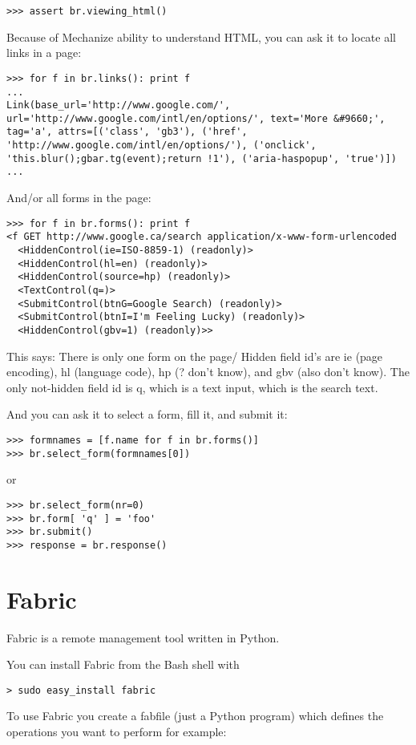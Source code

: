 \documentclass[justified,sixbynine]{tufte-book}
\theoremstyle{plain}%
\theoremstyle{definition}
\theoremstyle{remark}
\begin{document}
\begin{fullwidth}
\begin{lstlisting}
>>> assert br.viewing_html()
\end{lstlisting}
Because of Mechanize ability to understand HTML, you can ask it to locate all links in a page:
\begin{lstlisting}
>>> for f in br.links(): print f
...
Link(base_url='http://www.google.com/', url='http://www.google.com/intl/en/options/', text='More &#9660;', tag='a', attrs=[('class', 'gb3'), ('href', 'http://www.google.com/intl/en/options/'), ('onclick', 'this.blur();gbar.tg(event);return !1'), ('aria-haspopup', 'true')])
...
\end{lstlisting}
And/or all forms in the page:
\begin{lstlisting}
>>> for f in br.forms(): print f
<f GET http://www.google.ca/search application/x-www-form-urlencoded
  <HiddenControl(ie=ISO-8859-1) (readonly)>
  <HiddenControl(hl=en) (readonly)>
  <HiddenControl(source=hp) (readonly)>
  <TextControl(q=)>
  <SubmitControl(btnG=Google Search) (readonly)>
  <SubmitControl(btnI=I'm Feeling Lucky) (readonly)>
  <HiddenControl(gbv=1) (readonly)>>
\end{lstlisting}
This says: There is only one form on the page/ Hidden field id's are ie (page encoding), hl (language code), hp (? don't know), and gbv (also don't know). The only not-hidden field id is q, which is a text input, which is the search text.

And you can ask it to select a form, fill it, and submit it:
\begin{lstlisting}
>>> formnames = [f.name for f in br.forms()]
>>> br.select_form(formnames[0])
\end{lstlisting}
or
\begin{lstlisting}
>>> br.select_form(nr=0)
>>> br.form[ 'q' ] = 'foo'
>>> br.submit()
>>> response = br.response()
\end{lstlisting}

\goodbreak\chapter{Fabric}

Fabric is a remote management tool written in Python.

You can install Fabric from the Bash shell with
\begin{lstlisting}
> sudo easy_install fabric
\end{lstlisting}

To use Fabric you create a fabfile (just a Python program) which defines the operations you want to perform for example:


\end{fullwidth}
\end{document}

